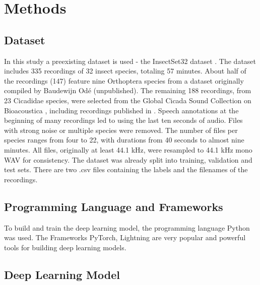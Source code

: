 

\section{Methods}
\label{methods}

\subsection{Dataset}

In this study a preexisting dataset is used - the InsectSet32 dataset \autocite{faissInsectSet32DatasetAutomatic2022}. 
The dataset includes 335 recordings of 32 insect species, totaling 57 minutes.
About half of the recordings (147) feature nine Orthoptera species from a dataset originally compiled by Baudewijn Odé (unpublished). 
The remaining 188 recordings, from 23 Cicadidae species, were selected from the Global Cicada Sound 
Collection on Bioacoustica \autocite{bakerBioAcousticaFreeOpen2015}, including recordings 
published in \autocites{bakerGlobalCicadaSound2015}{poppleRevisionMyopsaltaCrucifera2017}. 
Speech annotations at the beginning of many recordings led to using the last ten seconds of audio. 
Files with strong noise or multiple species were removed. The number of files per species ranges from four to 22, 
with durations from 40 seconds to almost nine minutes. All files, originally at least 44.1 kHz, 
were resampled to 44.1 kHz mono WAV for consistency.
The dataset was already split into training, validation and test sets. There are two .csv files containing
the labels and the filenames of the recordings.

\subsection{Programming Language and Frameworks}
To build and train the deep learning model, the programming language Python was used.
The Frameworks PyTorch, Lightning are very popular and powerful tools for building deep learning models.

\subsection{Deep Learning Model}

